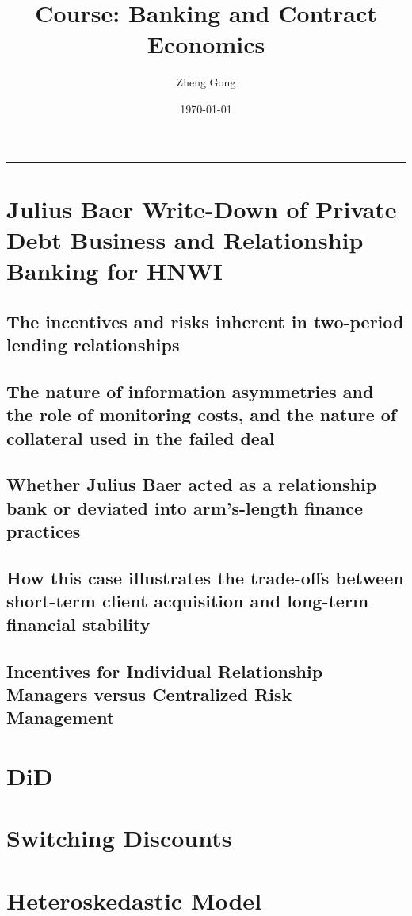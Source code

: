 \documentclass[12pt]{article}
\title{Course: Banking and Contract Economics}
\author{Zheng Gong}
\date{\today}
\begin{document}
\maketitle
\thispagestyle{empty}
\begin{center}
    \rule{0.8\textwidth}{0.4pt}
\end{center}
\vspace{1em}

\tableofcontents
\newpage


\section{Julius Baer Write-Down of Private Debt Business and Relationship Banking for HNWI}
\subsection{The incentives and risks inherent in two-period lending relationships}



\subsection{The nature of information asymmetries and the role of monitoring costs, and the nature
of collateral used in the failed deal}



\subsection{Whether Julius Baer acted as a relationship bank or deviated into arm's-length finance
practices}


\subsection{How this case illustrates the trade-offs between short-term client acquisition and long-term financial stability}


\subsection{Incentives for Individual Relationship Managers versus Centralized Risk Management}


\section{DiD}


\section{Switching Discounts}


\section{Heteroskedastic Model}

\end{document}
